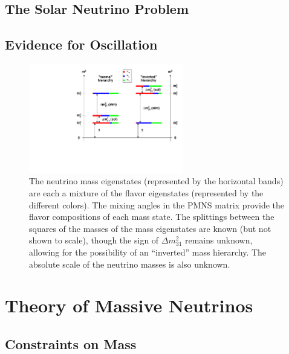 \documentclass[herrin-thesis.tex]{subfiles}
\begin{document}
\subsection{The Solar Neutrino Problem}

\subsection{Evidence for Oscillation}
\begin{figure}
	\centering
	\includegraphics[width=0.6\textwidth]{./plots/nu_mixing.pdf}
	\caption[Neutrino mixing]{The neutrino mass eigenstates (represented by the horizontal bands) are each a mixture of the flavor eigenstates (represented by the different colors). The mixing angles in the PMNS matrix provide the flavor compositions of each mass state. The splittings between the squares of the masses of the mass eigenstates are known (but not shown to scale), though the sign of \(\Delta m_{31}^2\) remains unknown, allowing for the possibility of an ``inverted'' mass hierarchy. The absolute scale of the neutrino masses is also unknown.}
	\label{fig:nu_mixing}
\end{figure}


\section{Theory of Massive Neutrinos}
\subsection{Constraints on Mass}
\end{document}
